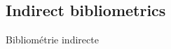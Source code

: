 




\subsection{Indirect bibliometrics}{Bibliométrie indirecte}

\label{subsec:indirectbibliometrics}


